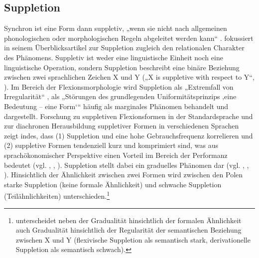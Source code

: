 \subsection{Suppletion}
\label{sec:7.1.4}
Synchron ist eine Form dann suppletiv, „wenn sie nicht nach allgemeinen phonologischen oder morphologischen Regeln abgeleitet werden kann“ \citep[78]{Nübling1999}. \citet{Melcuk2000} fokussiert in seinem Überblicksartikel zur Suppletion zugleich den relationalen Charakter des Phänomens. Suppletiv ist weder eine linguistische Einheit noch eine linguistische Operation, sondern Suppletion beschreibt eine binäre Beziehung zwischen zwei sprachlichen Zeichen X und Y („X is suppletive with respect to Y“, \citealt[510]{Melcuk2000}). Im Bereich der Flexionsmorphologie wird Suppletion als „Extremfall von Irregularität“ \citep[77]{Nübling1999}, als „Störungen des grundlegenden Uniformitätsprinzips ‚eine Bedeutung -- eine Form‘“ häufig als marginales Phänomen behandelt und dargestellt. Forschung zu suppletiven Flexionsformen in der Standardsprache und zur diachronen Herausbildung suppletiver Formen in verschiedenen Sprachen zeigt indes, dass (1) Suppletion und eine hohe Gebrauchsfrequenz korrelieren und (2) suppletive Formen tendenziell kurz und komprimiert sind, was aus sprachökonomischer Perspektive einen Vorteil im Bereich der Performanz bedeutet (vgl. \citealt{Nübling1999}, \citealt{Plank1981}, \citealt{Ronneberger-Sibold1988}). Suppletion stellt dabei ein graduelles Phänomen dar (vgl. \citealt[514--515 und 517--519]{Melcuk2000}, \citealt[30]{Plank1981}, \citealt[129]{Rowley1997}). Hinsichtlich der Ähnlichkeit zwischen zwei Formen wird zwischen den Polen starke Suppletion (keine formale Ähnlichkeit) und schwache Suppletion (Teilähnlichkeiten) unterschieden.\footnote{\citet[517--518]{Melcuk2000} unterscheidet neben der Gradualität hinsichtlich der formalen Ähnlichkeit auch Gra\-dualität hinsichtlich der Regularität der semantischen Beziehung zwischen X und Y (flexivische Suppletion als semantisch stark, derivationelle Suppletion als semantisch schwach).}

